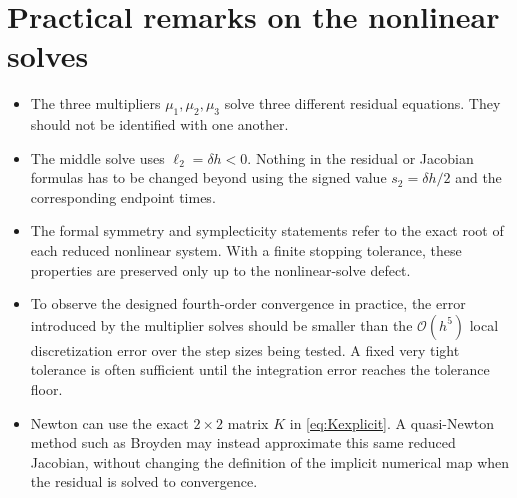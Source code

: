 \documentclass[11pt,a4paper]{article}
\newcommand{\OO}{\mathcal{O}}
\begin{document}
\section{Practical remarks on the nonlinear solves}
\begin{itemize}[leftmargin=0.7cm]
    \item The three multipliers $\mu_1,\mu_2,\mu_3$ solve three different residual equations. They should not be identified with one another.

    \item The middle solve uses $\ell_2=\delta h<0$. Nothing in the residual or Jacobian formulas has to be changed beyond using the signed value $s_2=\delta h/2$ and the corresponding endpoint times.

    \item The formal symmetry and symplecticity statements refer to the exact root of each reduced nonlinear system. With a finite stopping tolerance, these properties are preserved only up to the nonlinear-solve defect.

    \item To observe the designed fourth-order convergence in practice, the error introduced by the multiplier solves should be smaller than the $\OO(h^5)$ local discretization error over the step sizes being tested. A fixed very tight tolerance is often sufficient until the integration error reaches the tolerance floor.

    \item Newton can use the exact $2\times2$ matrix $K$ in \eqref{eq:Kexplicit}. A quasi-Newton method such as Broyden may instead approximate this same reduced Jacobian, without changing the definition of the implicit numerical map when the residual is solved to convergence.
\end{itemize}
\end{document}
